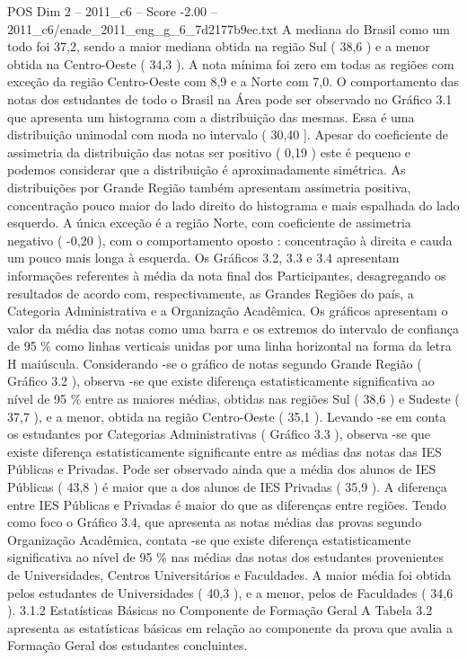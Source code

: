\begin{textsample}{POS Dim 2 – 2011\_c6 – Score -2.00 – 2011\_c6/enade\_2011\_eng\_g\_6\_7d2177b9ec.txt}
A mediana do Brasil como um todo foi 37,2, sendo a maior mediana obtida na região Sul ( 38,6 ) e a menor obtida na Centro-Oeste ( 34,3 ).
A nota mínima foi zero em todas as regiões com exceção da região Centro-Oeste com 8,9 e a Norte com 7,0.
O comportamento das notas dos estudantes de todo o Brasil na Área pode ser observado no Gráfico 3.1 que apresenta um histograma com a distribuição das mesmas.
Essa é uma distribuição unimodal com moda no intervalo ( 30,40 ].
Apesar do coeficiente de assimetria da distribuição das notas ser positivo ( 0,19 ) este é pequeno e podemos considerar que a distribuição é aproximadamente simétrica.
As distribuições por Grande Região também apresentam assimetria positiva, concentração pouco maior do lado direito do histograma e mais espalhada do lado esquerdo.
A única exceção é a região Norte, com coeficiente de assimetria negativo ( -0,20 ), com o comportamento oposto : concentração à direita e cauda um pouco mais longa à esquerda.
Os Gráficos 3.2, 3.3 e 3.4 apresentam informações referentes à média da nota final dos Participantes, desagregando os resultados de acordo com, respectivamente, as Grandes Regiões do país, a Categoria Administrativa e a Organização Acadêmica.
Os gráficos apresentam o valor da média das notas como uma barra e os extremos do intervalo de confiança de 95 \% como linhas verticais unidas por uma linha horizontal na forma da letra H maiúscula.
Considerando -se o gráfico de notas segundo Grande Região ( Gráfico 3.2 ), observa -se que existe diferença estatisticamente significativa ao nível de 95 \% entre as maiores médias, obtidas nas regiões Sul ( 38,6 ) e Sudeste ( 37,7 ), e a menor, obtida na região Centro-Oeste ( 35,1 ).
Levando -se em conta os estudantes por Categorias Administrativas ( Gráfico 3.3 ), observa -se que existe diferença estatisticamente significante entre as médias das notas das IES Públicas e Privadas.
Pode ser observado ainda que a média dos alunos de IES Públicas ( 43,8 ) é maior que a dos alunos de IES Privadas ( 35,9 ).
A diferença entre IES Públicas e Privadas é maior do que as diferenças entre regiões.
Tendo como foco o Gráfico 3.4, que apresenta as notas médias das provas segundo Organização Acadêmica, contata -se que existe diferença estatisticamente significativa ao nível de 95 \% nas médias das notas dos estudantes provenientes de Universidades, Centros Universitários e Faculdades.
A maior média foi obtida pelos estudantes de Universidades ( 40,3 ), e a menor, pelos de Faculdades ( 34,6 ). 3.1.2 Estatísticas Básicas no Componente de Formação Geral A Tabela 3.2 apresenta as estatísticas básicas em relação ao componente da prova que avalia a Formação Geral dos estudantes concluintes.

\end{textsample}
